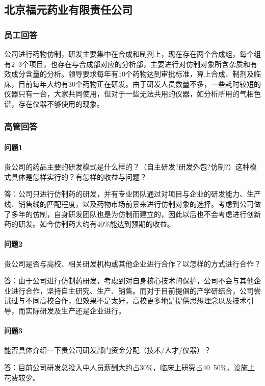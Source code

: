 \documentclass[twocolumn,openany]{ctexbook}
\begin{document}
	\subsection*{北京福元药业有限责任公司}
	\subsubsection*{员工回答}公司进行药物仿制，研发主要集中在合成和制剂上，现在存在两个合成组，每个组有2~3个项目，也存在与合成部对应的分析部，主要进行对仿制对象所含杂质和有效成分含量的分析。领导要求每年有10个药物达到审批标准，算上合成、制剂及临床，目前每年大约有30个药物正在研发。由于研发人员数量不多，一些耗时较短的仪器只有一台，大家共同使用，但对于一些无法共用的仪器，如分析所用的气相色谱，存在仪器不够使用的现象。
	
	\subsubsection*{高管回答}
	
	\paragraph{问题1}贵公司的药品主要的研发模式是什么样的？（自主研发?研发外包?仿制?）这种模式具体是怎样实行的？有怎样的收益与问题？
	
	答：公司只进行仿制药的研发，并有专业团队通过对项目与企业的研发能力、生产线、销售线的匹配程度，以及药物市场前景来进行仿制对象的选择。考虑到公司做了多年的仿制，自身研发团队也是为仿制而建立的，因此以后也不会考虑进行创新药的研发。如今仿制药大约有40\%能达到预期的收益。
	
	\paragraph{问题2}贵公司是否与高校、相关研发机构或其他企业进行合作？以怎样的方式进行合作？
	
	答：由于公司进行仿制药研发，考虑到对自身核心技术的保护，公司不会与其他企业进行合作，坚持自主研究、生产、销售。而对于目前提倡的产学研结合，公司尝试过与不同高校合作，但效果不是太好，高校更多地是提供思想理念以及技术引导，而实际研发及生产还是企业进行。
	
	\paragraph{问题3}能否具体介绍一下贵公司研发部门资金分配（技术/人才/仪器）？
	
	答：目前公司研发总投入中人员薪酬大约占30\%，临床上研究占40~50\%，设施上花费较少。
	
\end{document}
